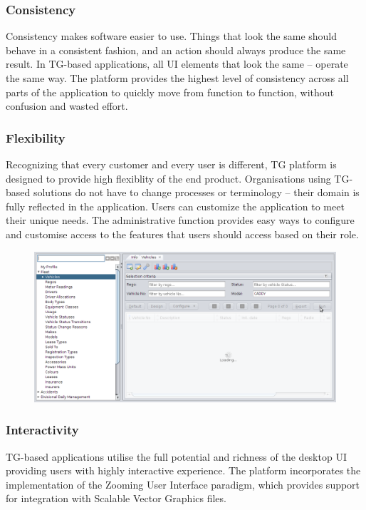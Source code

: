 \documentclass[a4paper,12pt,twocolumn]{article}
\begin{document}
\subsubsection*{Consistency}

  Consistency makes software easier to use. 
  Things that look the same should behave in a consistent fashion, and an action should always produce the same result. 
  In TG-based applications, all UI elements that look the same -- operate the same way. 
  The platform provides the highest level of consistency across all parts of the application to quickly move from function to function, without confusion and wasted effort.
 
\subsubsection*{Flexibility}
  Recognizing that every customer and every user is different, TG platform is designed to provide high flexiblity of the end product. 
  Organisations using TG-based solutions do not have to change processes or terminology -- their domain is fully reflected in the application. 
  Users can customize the application to meet their unique needs.
  The administrative function provides easy ways to configure and customise access to the features that users should access based on their role.

  \begin{figure}[!h]
  \centering
  \includegraphics[scale=0.2]{images/03-running.png}
  \end{figure}

\subsubsection*{Interactivity}
  TG-based applications utilise the full potential and richness of the desktop UI providing users with highly interactive experience.
  The platform incorporates the implementation of the Zooming User Interface paradigm, which provides support for integration with Scalable Vector Graphics files.
\end{document}
